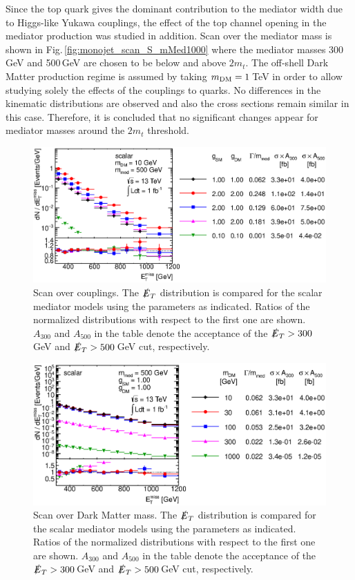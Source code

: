 Since the top quark gives the dominant contribution to the mediator width due to Higgs-like Yukawa couplings, the effect of the top channel opening in the mediator production was studied in addition. Scan over the mediator mass is shown in Fig.\,\ref{fig:monojet_scan_S_mMed1000} where the mediator masses 300\,GeV and 500\,GeV are chosen to be below and above $2m_t$. The off-shell Dark Matter production regime is assumed by taking $m_{\rm{DM}}=1$\,TeV in order to allow studying solely the effects of the couplings to quarks. 
No differences in the kinematic distributions are observed and also the cross sections remain similar in this case. Therefore, it is concluded that no significant changes appear for mediator masses around the $2m_t$ threshold.

\begin{figure}
\centering
\includegraphics[width=0.9\linewidth]{figures/monojet/scan_g_S_10_500.eps}
\caption{Scan over couplings. The $\slashed{E}_T$ distribution is compared for the scalar mediator models using the parameters as indicated. Ratios of the normalized distributions with respect to the first one are shown. $A_{300}$ and $A_{500}$ in the table denote the acceptance of the $\slashed{E}_T>300$\,GeV and $\slashed{E}_T>500$\,GeV cut, respectively.}
\label{fig:monojet_scan_S_g}
\end{figure}

\begin{figure}
\centering
\includegraphics[width=0.9\linewidth]{figures/monojet/scan_mDM_S_500.eps}
\caption{Scan over Dark Matter mass. The $\slashed{E}_T$ distribution is compared for the scalar mediator models using the parameters as indicated. Ratios of the normalized distributions with respect to the first one are shown. $A_{300}$ and $A_{500}$ in the table denote the acceptance of the $\slashed{E}_T>300$\,GeV and $\slashed{E}_T>500$\,GeV cut, respectively.}
\label{fig:monojet_scan_S_mDM1000}
\end{figure}

